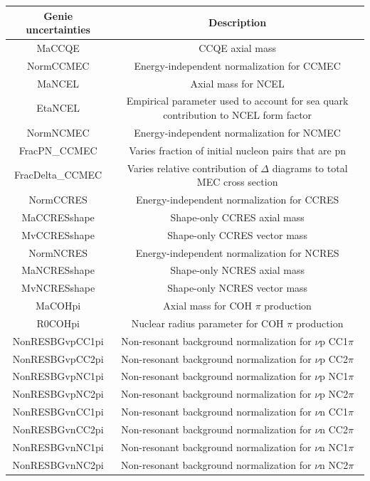 \documentclass[a4paper]{article}
\begin{document}
\begin{table}[H]
\centering
 \begin{tabular}{| c | c |} 
    \hline
\hline
Genie uncertainties & Description\\
\hline
MaCCQE & CCQE axial mass\\
NormCCMEC & Energy-independent normalization for CCMEC\\
MaNCEL & Axial mass for NCEL\\
EtaNCEL & Empirical parameter used to account for sea quark contribution to NCEL form factor\\
NormNCMEC & Energy-independent normalization for NCMEC\\
FracPN\_CCMEC & Varies fraction of initial nucleon pairs that are pn\\
FracDelta\_CCMEC & Varies relative contribution of $\Delta$ diagrams to total MEC cross section\\
NormCCRES & Energy-independent normalization for CCRES\\
MaCCRESshape & Shape-only CCRES axial mass\\
MvCCRESshape & Shape-only CCRES vector mass\\
NormNCRES & Energy-independent normalization for NCRES\\
MaNCRESshape & Shape-only NCRES axial mass\\
MvNCRESshape & Shape-only NCRES vector mass\\
MaCOHpi & Axial mass for COH $\pi$ production\\
R0COHpi & Nuclear radius parameter for COH $\pi$ production\\
NonRESBGvpCC1pi & Non-resonant background normalization for $\nu$p CC1$\pi$\\
NonRESBGvpCC2pi & Non-resonant background normalization for $\nu$p CC2$\pi$\\
NonRESBGvpNC1pi & Non-resonant background normalization for $\nu$p NC1$\pi$\\
NonRESBGvpNC2pi & Non-resonant background normalization for $\nu$p NC2$\pi$\\
NonRESBGvnCC1pi & Non-resonant background normalization for $\nu$n CC1$\pi$\\
NonRESBGvnCC2pi & Non-resonant background normalization for $\nu$n CC2$\pi$\\
NonRESBGvnNC1pi & Non-resonant background normalization for $\nu$n NC1$\pi$\\
NonRESBGvnNC2pi & Non-resonant background normalization for $\nu$n NC2$\pi$\\

\end{tabular}
\end{table}
\end{document}
